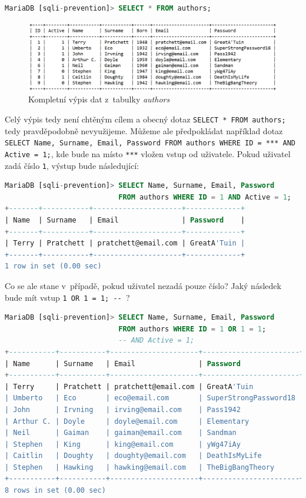 \begin{lstlisting}[language=sql]
MariaDB [sqli-prevention]> SELECT * FROM authors;
\end{lstlisting}

\begin{figure}[h!]
    \label{fig:data_authors}
    \centering
    \includegraphics[scale=0.75]{obrazky-figures/table.pdf}
    \caption{Kompletní výpis dat z~tabulky \textit{authors}}
\end{figure}

\Bat{} Celý výpis tedy není chtěným cílem a obecný dotaz \texttt{SELECT * FROM authors;} tedy pravděpodobně nevyužijeme. Můžeme ale předpokládat
například dotaz \texttt{SELECT Name, Surname, Email, Password FROM authors WHERE ID = *** AND Active = 1;}, kde bude na místo \texttt{***}
vložen vstup od uživatele. Pokud uživatel zadá číslo \texttt{1}, výstup bude následující:

\begin{lstlisting}[language=sql]
MariaDB [sqli-prevention]> SELECT Name, Surname, Email, Password 
                           FROM authors WHERE ID = 1 AND Active = 1;
+-------+-----------+---------------------+-------------+
| Name  | Surname   | Email               | Password    |
+-------+-----------+---------------------+-------------+
| Terry | Pratchett | pratchett@email.com | GreatA'Tuin |
+-------+-----------+---------------------+-------------+
1 row in set (0.00 sec)
\end{lstlisting}

\Bat{} Co se ale stane v~případě, pokud uživatel nezadá pouze číslo? Jaký následek bude mít vstup \texttt{1 OR 1 = 1; -{}- }?

\begin{lstlisting}[language=sql]
MariaDB [sqli-prevention]> SELECT Name, Surname, Email, Password 
                           FROM authors WHERE ID = 1 OR 1 = 1; 
                           -- AND Active = 1;
+-----------+-----------+---------------------+-----------------------+
| Name      | Surname   | Email               | Password              |
+-----------+-----------+---------------------+-----------------------+
| Terry     | Pratchett | pratchett@email.com | GreatA'Tuin           |
| Umberto   | Eco       | eco@email.com       | SuperStrongPassword18 |
| John      | Irvning   | irving@email.com    | Pass1942              |
| Arthur C. | Doyle     | doyle@email.com     | Elementary            |
| Neil      | Gaiman    | gaiman@email.com    | Sandman               |
| Stephen   | King      | king@email.com      | yWg47iAy              |
| Caitlin   | Doughty   | doughty@email.com   | DeathIsMyLife         |
| Stephen   | Hawking   | hawking@email.com   | TheBigBangTheory      |
+-----------+-----------+---------------------+-----------------------+
8 rows in set (0.00 sec)
\end{lstlisting}

